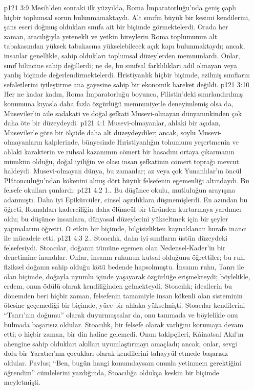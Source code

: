\vs p121 3:9 Mesih’den sonraki ilk yüzyılda, Roma İmparatorluğu’nda geniş çaplı hiçbir toplumsal sorun bulunmamaktaydı. Alt sınıfın büyük bir kesimi kendilerini, şans eseri doğmuş oldukları sınıfa ait bir biçimde görmektelerdi. Orada her zaman, aracılığıyla yetenekli ve yetkin bireylerin Roma toplumunun alt tabakasından yüksek tabakasına yükselebilecek açık kapı bulunmaktaydı; ancak, insanlar genellikle, sahip oldukları toplumsal düzeylerden memnunlardı. Onlar, sınıf bilincine sahip değillerdi; ne de, bu sınıfsal farklılıkları adil olmayan veya yanlış biçimde değerlendirmektelerdi. Hristiyanlık hiçbir biçimde, ezilmiş sınıfların sefaletlerini iyileştirme ana gayesine sahip bir ekonomik hareket değildi.
\vs p121 3:10 Her ne kadar kadın, Roma İmparatorluğu boyunca, Filistin’deki sınırlandırılmış konumuna kıyasla daha fazla özgürlüğü memnuniyetle deneyimlemiş olsa da, Museviler’in aile sadakati ve doğal şefkati Musevi\hyp{}olmayan dünyanınkinden çok daha öte bir düzeydeydi.
\vs p121 4:1 Musevi\hyp{}olmayanlar, ahlaki bir açıdan, Museviler’e göre bir ölçüde daha alt düzeydeydiler; ancak, soylu Musevi\hyp{}olmayanların kalplerinde, bünyesinde Hıristiyanlığın tohumunu yeşertmenin ve ahlaki karakterin ve ruhsal kazanımın cömert bir hasadını ortaya çıkarmanın mümkün olduğu, doğal iyiliğin ve olası insan şefkatinin cömert toprağı mevcut haldeydi. Musevi\hyp{}olmayan dünya, bu zamanlar; az veya çok Yunanlılar’ın öncül Plâtonculuğu’ndan kökenini almış dört büyük felsefenin egemenliği altındaydı. Bu felsefe okulları şunlardı:
\vs p121 4:2 1.\bibnobreakspace {}. Bu düşünce okulu, mutluluğun arayışına adanmıştı. Daha iyi Epikürcüler, cinsel aşırılıklara düşmemişlerdi. En azından bu öğreti, Romalıları kaderciliğin daha ölümcül bir türünden kurtarmaya yardımcı oldu; bu düşünce insanlara, dünyasal düzeylerini yükseltmek için bir şeyler yapmalarını öğretti. O etkin bir biçimde, bilgisizlikten kaynaklanan hurafe inancı ile mücadele etti.
\vs p121 4:3 2.\bibnobreakspace {}. Stoacılık, daha iyi sınıfların üstün düzeydeki felsefesiydi. Stoacılar, doğanın tümüne egemen olan Nedensel\hyp{}Kader’in bir denetimine inandılar. Onlar, insanın ruhunun kutsal olduğunu öğrettiler; bu ruh, fiziksel doğanın sahip olduğu kötü bedende hapsolmuştu. İnsanın ruhu, Tanrı ile olan biçimde, doğayla uyumlu içinde yaşayarak özgürlüğe erişmekteydi; böylelikle, erdem, onun ödülü olarak kendiliğinden gelmekteydi. Stoacılık; ideallerin bu dönemden beri hiçbir zaman, felsefenin tamamiyle insan kökenli olan sisteminin ötesine geçemediği bir biçimde, yüce bir ahlaka yükselmişti. Stoacılar kendilerini “Tanrı’nın doğumu” olarak duyurmuşsalar da, onu tanımada ve böylelikle onu bulmada başarısız oldular. Stoacılık, bir felsefe olarak varlığını korumaya devam etti; o hiçbir zaman, bir din haline gelemedi. Onun takipçileri, Kâinatsal Akıl’ın ahengine sahip oldukları akılları uyumlaştırmayı amaçladı; ancak, onlar, sevgi dolu bir Yaratıcı’nın çocukları olarak kendilerini tahayyül etmede başarısız oldular. Pavlus; “Ben, bugün hangi konumdaysam onunla yetinmem gerektiğini öğrendim” cümlelerini yazdığında, Stoacılığa oldukça keskin bir biçimde meyletmişti.
